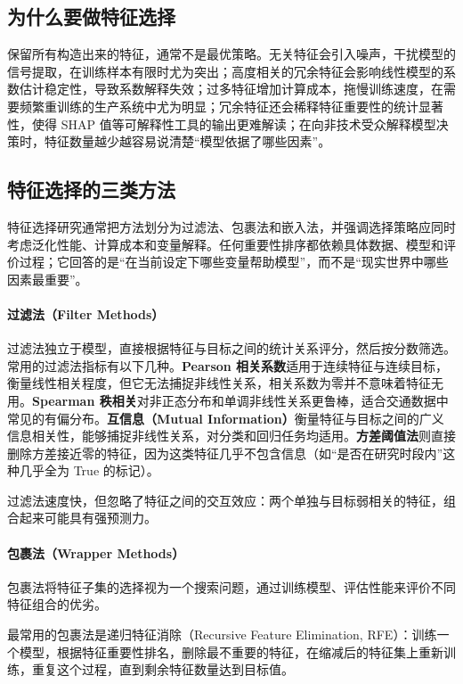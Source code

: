 \subsection{为什么要做特征选择}

保留所有构造出来的特征，通常不是最优策略。无关特征会引入噪声，干扰模型的信号提取，在训练样本有限时尤为突出；高度相关的冗余特征会影响线性模型的系数估计稳定性，导致系数解释失效；过多特征增加计算成本，拖慢训练速度，在需要频繁重训练的生产系统中尤为明显；冗余特征还会稀释特征重要性的统计显著性，使得 SHAP 值等可解释性工具的输出更难解读；在向非技术受众解释模型决策时，特征数量越少越容易说清楚“模型依据了哪些因素”。

\subsection{特征选择的三类方法}

特征选择研究通常把方法划分为过滤法、包裹法和嵌入法，并强调选择策略应同时考虑泛化性能、计算成本和变量解释\cite{guyon2003introduction}。任何重要性排序都依赖具体数据、模型和评价过程；它回答的是“在当前设定下哪些变量帮助模型”，而不是“现实世界中哪些因素最重要”。

\paragraph{过滤法（Filter Methods）}

过滤法独立于模型，直接根据特征与目标之间的统计关系评分，然后按分数筛选。常用的过滤法指标有以下几种。\textbf{Pearson 相关系数}适用于连续特征与连续目标，衡量线性相关程度，但它无法捕捉非线性关系，相关系数为零并不意味着特征无用。\textbf{Spearman 秩相关}对非正态分布和单调非线性关系更鲁棒，适合交通数据中常见的有偏分布。\textbf{互信息（Mutual Information）}衡量特征与目标之间的广义信息相关性，能够捕捉非线性关系，对分类和回归任务均适用。\textbf{方差阈值法}则直接删除方差接近零的特征，因为这类特征几乎不包含信息（如“是否在研究时段内”这种几乎全为 True 的标记）。

过滤法速度快，但忽略了特征之间的交互效应：两个单独与目标弱相关的特征，组合起来可能具有强预测力。

\paragraph{包裹法（Wrapper Methods）}

包裹法将特征子集的选择视为一个搜索问题，通过训练模型、评估性能来评价不同特征组合的优劣。

最常用的包裹法是递归特征消除（Recursive Feature Elimination, RFE）：训练一个模型，根据特征重要性排名，删除最不重要的特征，在缩减后的特征集上重新训练，重复这个过程，直到剩余特征数量达到目标值。

